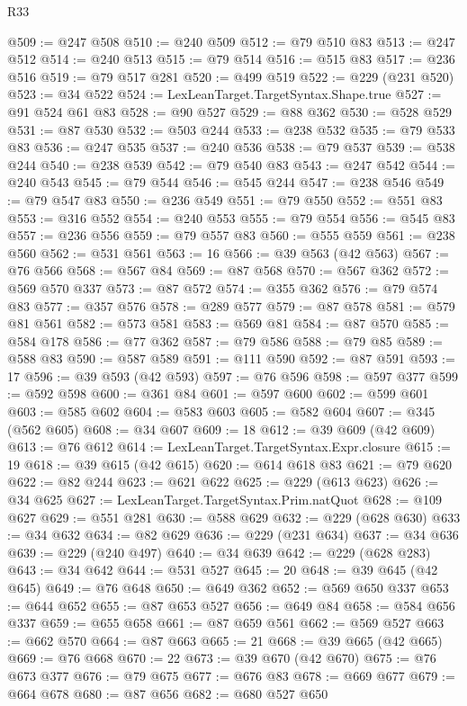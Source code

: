 \begin{lexlean}{R33}
\begin{coremodule}
@509 := @247 @508
@510 := @240 @509
@512 := @79 @510 @83
@513 := @247 @512
@514 := @240 @513
@515 := @79 @514
@516 := @515 @83
@517 := @236 @516
@519 := @79 @517 @281
@520 := @499 @519
@522 := @229 (@231 @520)
@523 := @34 @522
@524 := LexLeanTarget.TargetSyntax.Shape.true
@527 := @91 @524 @61 @83
@528 := @90 @527
@529 := @88 @362
@530 := @528 @529
@531 := @87 @530
@532 := @503 @244
@533 := @238 @532
@535 := @79 @533 @83
@536 := @247 @535
@537 := @240 @536
@538 := @79 @537
@539 := @538 @244
@540 := @238 @539
@542 := @79 @540 @83
@543 := @247 @542
@544 := @240 @543
@545 := @79 @544
@546 := @545 @244
@547 := @238 @546
@549 := @79 @547 @83
@550 := @236 @549
@551 := @79 @550
@552 := @551 @83
@553 := @316 @552
@554 := @240 @553
@555 := @79 @554
@556 := @545 @83
@557 := @236 @556
@559 := @79 @557 @83
@560 := @555 @559
@561 := @238 @560
@562 := @531 @561
@563 := 16
@566 := @39 @563 (@42 @563)
@567 := @76 @566
@568 := @567 @84
@569 := @87 @568
@570 := @567 @362
@572 := @569 @570 @337
@573 := @87 @572
@574 := @355 @362
@576 := @79 @574 @83
@577 := @357 @576
@578 := @289 @577
@579 := @87 @578
@581 := @579 @81 @561
@582 := @573 @581
@583 := @569 @81
@584 := @87 @570
@585 := @584 @178
@586 := @77 @362
@587 := @79 @586
@588 := @79 @85
@589 := @588 @83
@590 := @587 @589
@591 := @111 @590
@592 := @87 @591
@593 := 17
@596 := @39 @593 (@42 @593)
@597 := @76 @596
@598 := @597 @377
@599 := @592 @598
@600 := @361 @84
@601 := @597 @600
@602 := @599 @601
@603 := @585 @602
@604 := @583 @603
@605 := @582 @604
@607 := @345 (@562 @605)
@608 := @34 @607
@609 := 18
@612 := @39 @609 (@42 @609)
@613 := @76 @612
@614 := LexLeanTarget.TargetSyntax.Expr.closure
@615 := 19
@618 := @39 @615 (@42 @615)
@620 := @614 @618 @83
@621 := @79 @620
@622 := @82 @244
@623 := @621 @622
@625 := @229 (@613 @623)
@626 := @34 @625
@627 := LexLeanTarget.TargetSyntax.Prim.natQuot
@628 := @109 @627
@629 := @551 @281
@630 := @588 @629
@632 := @229 (@628 @630)
@633 := @34 @632
@634 := @82 @629
@636 := @229 (@231 @634)
@637 := @34 @636
@639 := @229 (@240 @497)
@640 := @34 @639
@642 := @229 (@628 @283)
@643 := @34 @642
@644 := @531 @527
@645 := 20
@648 := @39 @645 (@42 @645)
@649 := @76 @648
@650 := @649 @362
@652 := @569 @650 @337
@653 := @644 @652
@655 := @87 @653 @527
@656 := @649 @84
@658 := @584 @656 @337
@659 := @655 @658
@661 := @87 @659 @561
@662 := @569 @527
@663 := @662 @570
@664 := @87 @663
@665 := 21
@668 := @39 @665 (@42 @665)
@669 := @76 @668
@670 := 22
@673 := @39 @670 (@42 @670)
@675 := @76 @673 @377
@676 := @79 @675
@677 := @676 @83
@678 := @669 @677
@679 := @664 @678
@680 := @87 @656
@682 := @680 @527 @650

\end{coremodule}
\end{lexlean}

